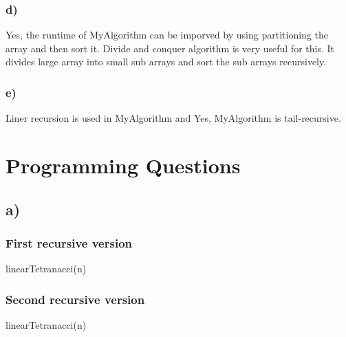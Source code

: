 \documentclass[10pt, a4paper]{article}
\begin{document}
	
	\subsubsection*{d)}
	{Yes, the runtime of MyAlgorithm can be imporved by using partitioning the array and then sort it. Divide and conquer algorithm is very useful for this. It divides large array into small sub arrays and sort the sub arrays recursively.}
	\subsubsection*{e)}
	{Liner recursion is used in MyAlgorithm and Yes, MyAlgorithm is tail-recursive.}

	\newpage
	\section*{Programming Questions}
	\subsection*{a)}
	\subsubsection*{First recursive version}
	{\SetAlgoNoLine%
    \begin{algorithm}
        
            \DontPrintSemicolon %
            
            
        \EndFunction
        \caption{linearTetranacci(n)}
    \end{algorithm}}%
    
    \subsubsection*{Second recursive version}
    {\SetAlgoNoLine%
    \begin{algorithm}
        
            \DontPrintSemicolon %
            
            
        \EndFunction
        \caption{linearTetranacci(n)}
    \end{algorithm}}%
    
\end{document}
